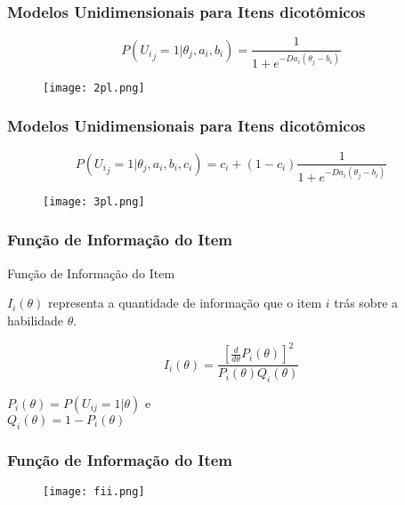 \documentclass{beamer}
\begin{document}
	
	\begin{frame}
		
		\frametitle{Modelos Unidimensionais para Itens dicotômicos}
		
		\[
			P({U_i}_j = 1|{\theta}_j, a_i, b_i) =
			\frac{1}{1+e^{-Da_i(\theta_j- b_i)}}
		\]
		
		\begin{figure}
			\texttt{[image: 2pl.png]}
		\end{figure}

		
	\end{frame}
	
	
	\begin{frame}
		
		\frametitle{Modelos Unidimensionais para Itens dicotômicos}
		\[
			P({U_i}_j = 1|{\theta}_j, a_i, b_i, c_i) =
			c_i+(1-c_i)\frac{1}{1+e^{-Da_i(\theta_j- b_i)}}
		\]
		\begin{figure}
			\texttt{[image: 3pl.png]}
		\end{figure}

		
	\end{frame}

	
	\begin{frame}
		
		\frametitle{Função de Informação do Item}
		
			\begin{center}
			Função de Informação do Item
		\end{center}
		
		$I_i(\theta)$ representa a quantidade de informação que o item $i$ trás sobre a
		habilidade $\theta$.
		
		\[
		I_i(\theta) = \dfrac{[\frac{d}{d\theta}P_i(\theta)]^2}{P_i(\theta)Q_i(\theta)}
		\]	
		
		$P_i(\theta) = P(U_{ij} = 1| \theta) $ e\\ $ Q_i(\theta) = 1 - P_i(\theta) $

	\end{frame}
	
	\begin{frame}
		
		\frametitle{Função de Informação do Item}

		\begin{figure}
			\texttt{[image: fii.png]}
		\end{figure}
		
	\end{frame}
		
\end{document}
